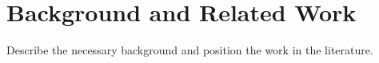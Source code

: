 \chapter{Background and Related Work}
\label{ch:background}

Describe the necessary background and position the work in the literature.
